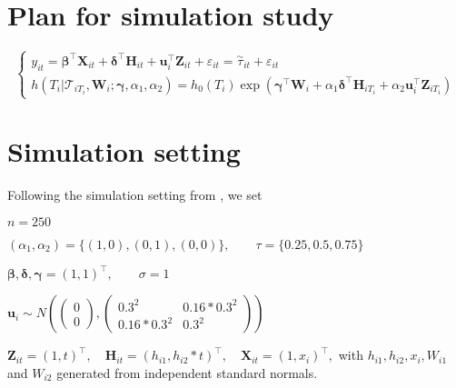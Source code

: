 \documentclass{article}
\begin{document}
\section{Plan for simulation study}

\begin{equation}\label{eqn:joint}
\left\{
\begin{array}{l}
y_{it} = \boldsymbol{\beta}^{\top}{\boldsymbol X}_{it} + \boldsymbol{\delta}^{\top}{\boldsymbol H}_{it} + {\boldsymbol u}_i^{\top}{\boldsymbol Z}_{it} + \varepsilon_{it} =\overset{\sim}{\tau}_{it} + \varepsilon_{it}\\
h(T_i|\mathcal{T}_{iT_i}, {\boldsymbol W}_i;  \boldsymbol{\gamma}, \alpha_1, 
\alpha_2) = h_0(T_i)\exp(\boldsymbol{\gamma}^{\top}{\boldsymbol W}_i + \alpha_1\boldsymbol{\delta}^{\top}{\boldsymbol H}_{iT_i} + \alpha_2{\boldsymbol u}_i^{\top}{\boldsymbol Z}_{iT_i})
\end{array}
\right.
\end{equation}


\section{Simulation setting }
Following the simulation setting from \cite{farcomeni2014longitudinal}, we set\par

$n=250$\par
$(\alpha_1, \alpha_2)=\{(1, 0), (0, 1), (0, 0)\}, \hspace{2em}\tau=\{0.25, 0.5, 0.75\}$\par
$\boldsymbol{\beta, \delta, \gamma}=(1, 1)^{\top}, \hspace{2em} \sigma=1$\par
$\boldsymbol{u}_i\sim N\left(\begin{pmatrix} 0\\ 0\end{pmatrix}, \begin{pmatrix}0.3^2 & 0.16*0.3^2\\ 0.16*0.3^2 & 0.3^2\end{pmatrix} \right)$\par

${\boldsymbol Z}_{it}=(1, t)^{\top},\hspace{1em} {\boldsymbol H}_{it}=(h_{i1}, h_{i2}*t)^{\top},\hspace{1em} {\boldsymbol X}_{it}=(1, x_i)^{\top},$ with $h_{i1}, h_{i2}, x_i, W_{i1}$ and $W_{i2}$ generated from independent standard normals. \par
\end{document}
